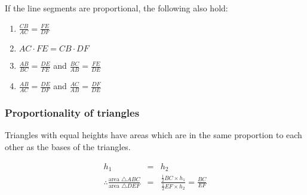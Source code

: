 If the line segments are proportional, the following also hold:
\begin{enumerate}
\item $\frac{CB}{AC} = \frac{FE}{DF}$
\item $AC\cdot FE = CB\cdot DF$
\item $\frac{AB}{BC} = \frac{DE}{FE}$ and $\frac{BC}{AB} = \frac{FE}{DE}$
\item $\frac{AB}{AC} = \frac{DE}{DF}$ and $\frac{AC}{AB} = \frac{DF}{DE}$
\end{enumerate}

\subsubsection*{Proportionality of triangles}
Triangles with equal heights have areas which are in the same proportion to each other as the bases of the triangles.

\begin{eqnarray*}
h_1 &=& h_2\\
\therefore \frac{\text{area }\triangle ABC}{\text{area }\triangle DEF} &=& \frac{\frac{1}{2}BC \times h_1}{\frac{1}{2}EF \times h_2} = \frac{BC}{EF}
\end{eqnarray*}

